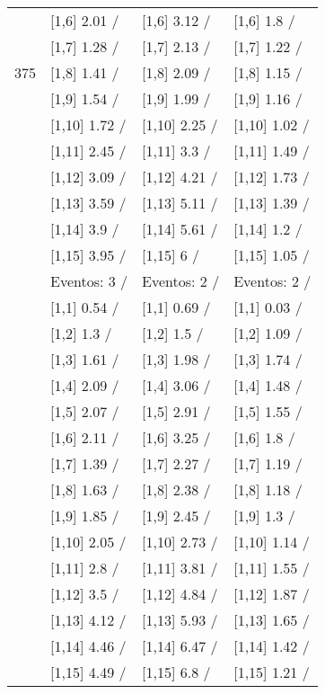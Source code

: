 \begin{table}
\begin{tabular}[t]{llll}
 & {}[1,6] 2.01  / & {}[1,6] 3.12  / & {}[1,6] 1.8  /\\
 & {}[1,7] 1.28  / & {}[1,7] 2.13  / & {}[1,7] 1.22  /\\
375 & {}[1,8] 1.41  / & {}[1,8] 2.09  / & {}[1,8] 1.15  /\\
\addlinespace
 & {}[1,9] 1.54  / & {}[1,9] 1.99  / & {}[1,9] 1.16  /\\
 & {}[1,10] 1.72  / & {}[1,10] 2.25  / & {}[1,10] 1.02  /\\
 & {}[1,11] 2.45  / & {}[1,11] 3.3  / & {}[1,11] 1.49  /\\
 & {}[1,12] 3.09  / & {}[1,12] 4.21  / & {}[1,12] 1.73  /\\
 & {}[1,13] 3.59  / & {}[1,13] 5.11  / & {}[1,13] 1.39  /\\
\addlinespace
 & {}[1,14] 3.9  / & {}[1,14] 5.61  / & {}[1,14] 1.2  /\\
 & {}[1,15] 3.95  / & {}[1,15] 6  / & {}[1,15] 1.05  /\\
 & Eventos:  3 / & Eventos:  2 / & Eventos:  2 /\\
 & {}[1,1] 0.54  / & {}[1,1] 0.69  / & {}[1,1] 0.03  /\\
 & {}[1,2] 1.3  / & {}[1,2] 1.5  / & {}[1,2] 1.09  /\\
\addlinespace
 & {}[1,3] 1.61  / & {}[1,3] 1.98  / & {}[1,3] 1.74  /\\
 & {}[1,4] 2.09  / & {}[1,4] 3.06  / & {}[1,4] 1.48  /\\
 & {}[1,5] 2.07  / & {}[1,5] 2.91  / & {}[1,5] 1.55  /\\
 & {}[1,6] 2.11  / & {}[1,6] 3.25  / & {}[1,6] 1.8  /\\
 & {}[1,7] 1.39  / & {}[1,7] 2.27  / & {}[1,7] 1.19  /\\
\addlinespace
500 & {}[1,8] 1.63  / & {}[1,8] 2.38  / & {}[1,8] 1.18  /\\
 & {}[1,9] 1.85  / & {}[1,9] 2.45  / & {}[1,9] 1.3  /\\
 & {}[1,10] 2.05  / & {}[1,10] 2.73  / & {}[1,10] 1.14  /\\
 & {}[1,11] 2.8  / & {}[1,11] 3.81  / & {}[1,11] 1.55  /\\
 & {}[1,12] 3.5  / & {}[1,12] 4.84  / & {}[1,12] 1.87  /\\
\addlinespace
 & {}[1,13] 4.12  / & {}[1,13] 5.93  / & {}[1,13] 1.65  /\\
 & {}[1,14] 4.46  / & {}[1,14] 6.47  / & {}[1,14] 1.42  /\\
 & {}[1,15] 4.49  / & {}[1,15] 6.8  / & {}[1,15] 1.21  /\\
\bottomrule
\end{tabular}
\end{table}

